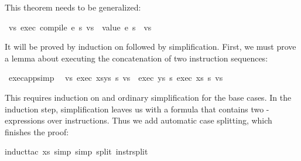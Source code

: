 \begin{isabellebody}
\isadelimproof
%
\endisadelimproof
%
\isatagproof
%
\endisatagproof
{\isafoldproof}%
%
\isadelimproof
%
\endisadelimproof
%
\begin{isamarkuptext}%
\noindent
This theorem needs to be generalized:%
\end{isamarkuptext}%
\isamarkuptrue%
\isamarkupfalse%
\ {}{}vs{}\ exec\ {}compile\ e{}\ s\ vs\ {}\ {}value\ e\ s{}\ {}\ vs{}%
\isadelimproof
%
\endisadelimproof
%
\isatagproof
%
\begin{isamarkuptxt}%
\noindent
It will be proved by induction on  followed by simplification.  
First, we must prove a lemma about executing the concatenation of two
instruction sequences:%
\end{isamarkuptxt}%
\isamarkuptrue%
%
\endisatagproof
{\isafoldproof}%
%
\isadelimproof
%
\endisadelimproof
{}\isamarkupfalse%
\ exec{}app{}simp{}{}\isanewline
\ \ {}{}vs{}\ exec\ {}xs{}ys{}\ s\ vs\ {}\ exec\ ys\ s\ {}exec\ xs\ s\ vs{}{}%
\isadelimproof
%
\endisadelimproof
%
\isatagproof
%
\begin{isamarkuptxt}%
\noindent
This requires induction on  and ordinary simplification for the
base cases. In the induction step, simplification leaves us with a formula
that contains two -expressions over instructions. Thus we add
automatic case splitting, which finishes the proof:%
\end{isamarkuptxt}%
\isamarkuptrue%
\isamarkupfalse%
{}induct{}tac\ xs{}\ simp{}\ simp\ split{}\ instr{}split{}%

\end{isabellebody}
